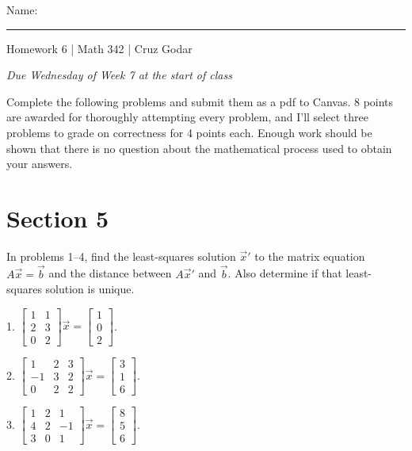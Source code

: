 \documentclass{article}
\begin{document}
\Large Name: \rule{2in}{0.15mm} \hfill Homework 6 | Math 342 | Cruz Godar \vspace{4pt} \normalsize

\textit{Due Wednesday of Week 7 at the start of class}

Complete the following problems and submit them as a pdf to Canvas. 8 points are awarded for thoroughly attempting every problem, and I'll select three problems to grade on correctness for 4 points each. Enough work should be shown that there is no question about the mathematical process used to obtain your answers.

\section{Section 5}

In problems 1--4, find the least-squares solution $\vec{x}'$ to the matrix equation $A\vec{x} = \vec{b}$ and the distance between $A\vec{x}'$ and $\vec{b}$. Also determine if that least-squares solution is unique.

1. $\left[\begin{array}{cc} 1& 1 \\ 2& 3 \\ 0& 2 \end{array}\right]\vec{x} = \left[\begin{array}{c} 1 \\ 0 \\ 2 \end{array}\right]$.

2. $\left[\begin{array}{ccc} 1& 2& 3 \\ -1& 3& 2 \\ 0& 2& 2 \end{array}\right]\vec{x} = \left[\begin{array}{c} 3 \\ 1 \\ 6 \end{array}\right]$.

3. $\left[\begin{array}{ccc} 1& 2& 1 \\ 4& 2& -1 \\ 3& 0& 1 \end{array}\right]\vec{x} = \left[\begin{array}{c} 8 \\ 5 \\ 6 \end{array}\right]$.
\end{document}

